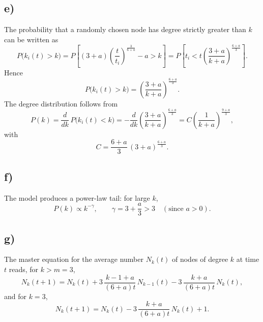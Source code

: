 \documentclass[11pt,a4paper]{article}
\begin{document}
\subsection*{e)}

The probability that a randomly chosen node has degree strictly greater than $k$ can be written as
\[
  P\bigl(k_i(t) > k\bigr)
  = P\left[
      (3 + a)\left(\frac{t}{t_i}\right)^{\frac{3}{6 + a}} - a > k
    \right]
  = P\left[
      t_i < t\left(\frac{3 + a}{k + a}\right)^{\frac{6 + a}{3}}
    \right].
\]
Hence
\[
  P\bigl(k_i(t) > k\bigr) = \left(\frac{3 + a}{k + a}\right)^{\frac{6 + a}{3}}.
\]
The degree distribution follows from
\[
  P(k) = \frac{d}{dk}\, P\bigl(k_i(t) < k\bigr)
  = -\frac{d}{dk}\left(\frac{3 + a}{k + a}\right)^{\frac{6 + a}{3}}
  = C\left(\frac{1}{k + a}\right)^{\frac{9 + a}{3}},
\]
with
\[
  C = \frac{6 + a}{3}\,(3 + a)^{\frac{6 + a}{3}}.
\]

\subsection*{f)}

The model produces a power-law tail: for large $k$,
\[
  P(k) \propto k^{-\gamma},
  \qquad
  \gamma = 3 + \frac{a}{3} > 3 \quad (\text{since } a > 0).
\]

\subsection*{g)}

The master equation for the average number $N_k(t)$ of nodes of degree $k$ at time $t$ reads, for $k > m = 3$,
\[
  N_k(t + 1)
  = N_k(t)
  + 3\,\frac{k - 1 + a}{(6 + a)t}\,N_{k - 1}(t)
  - 3\,\frac{k + a}{(6 + a)t}\,N_k(t),
\]
and for $k = 3$,
\[
  N_k(t + 1)
  = N_k(t)
  - 3\,\frac{k + a}{(6 + a)t}\,N_k(t)
  + 1.
\]
\end{document}
